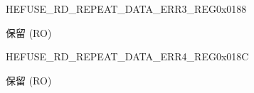     \begin{register}{H}{EFUSE\_RD\_REPEAT\_DATA\_ERR3\_REG}{0x0188}\label{regdesc:EFUSERDREPEATDATAERR3REG}
    \regnewline%
    \begin{regdesc}\begin{reglist}
    \label{fielddesc:EFUSERDREPEATDATAERR3}\item [EFUSE\_RD\_REPEAT\_DATA\_ERR3] 保留 (RO)
    \end{reglist}\end{regdesc}
    \end{register}


    \begin{register}{H}{EFUSE\_RD\_REPEAT\_DATA\_ERR4\_REG}{0x018C}\label{regdesc:EFUSERDREPEATDATAERR4REG}
    \regnewline%
    \begin{regdesc}\begin{reglist}
    \label{fielddesc:EFUSERDREPEATDATAERR4}\item [EFUSE\_RD\_REPEAT\_DATA\_ERR4] 保留 (RO)
    \end{reglist}\end{regdesc}
    \end{register}



